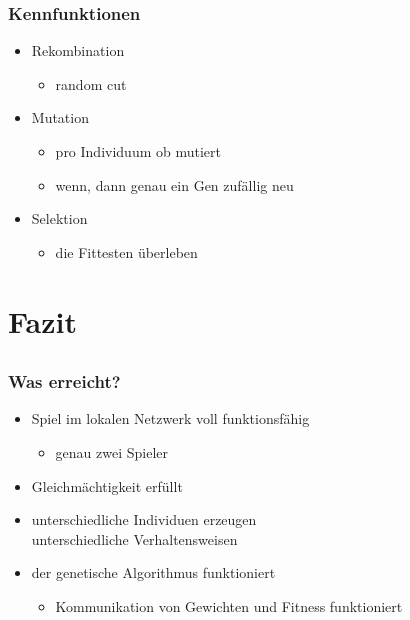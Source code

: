 \documentclass[compress]{beamer}
\begin{document}
\begin{frame}
	\frametitle{Kennfunktionen}

	\begin{itemize}
		\item Rekombination
		\begin{itemize}
			\item random cut
		\end{itemize}
		\item Mutation
		\begin{itemize}
			\item pro Individuum ob mutiert
			\item wenn, dann genau ein Gen zufällig neu
		\end{itemize}
		\item Selektion
		\begin{itemize}
			\item die Fittesten überleben
		\end{itemize}
		
		
	\end{itemize}
\end{frame}

\section{Fazit}
\subsection*{}

\begin{frame}
	\frametitle{Was erreicht?}

	\begin{itemize}
		\item Spiel im lokalen Netzwerk voll funktionsfähig
		\begin{itemize}
			\item genau zwei Spieler
		\end{itemize}
		\item Gleichmächtigkeit erfüllt
		\item unterschiedliche Individuen erzeugen\\
		 unterschiedliche Verhaltensweisen
		\item der genetische Algorithmus funktioniert
		\begin{itemize}
			\item Kommunikation von Gewichten und Fitness funktioniert
		\end{itemize}
	\end{itemize}
\end{frame}
\end{document}

